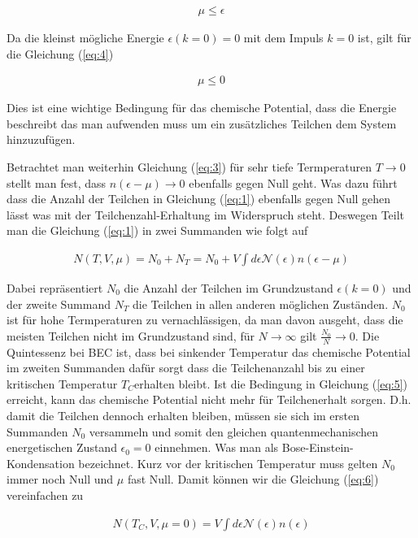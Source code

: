 \begin{align}
  \label{eq:4}
  \mu \le \epsilon
\end{align}

Da die kleinst mögliche Energie \(\epsilon(k=0) = 0\) mit dem Impuls \(k=0\) ist, gilt für die Gleichung (\ref{eq:4})

\begin{align}
  \label{eq:5}
  \mu \le 0
\end{align}

Dies ist eine wichtige Bedingung für das chemische Potential, dass die Energie beschreibt das man aufwenden muss um ein zusätzliches Teilchen dem System hinzuzufügen. 

Betrachtet man weiterhin Gleichung (\ref{eq:3}) für sehr tiefe Termperaturen \(T\to 0\) stellt man fest, dass \(n(\epsilon-\mu)\to 0\) ebenfalls gegen Null geht. Was dazu führt dass die Anzahl der Teilchen in Gleichung (\ref{eq:1}) ebenfalls gegen Null gehen lässt was mit der Teilchenzahl-Erhaltung im Widerspruch steht. Deswegen Teilt man die Gleichung (\ref{eq:1}) in zwei Summanden wie folgt auf

\begin{align}
  \label{eq:6}
   N(T,V,\mu) = N_0 + N_T = N_0 +  V\int d\epsilon \mathcal N(\epsilon) n(\epsilon-\mu)
\end{align}

Dabei repräsentiert \(N_0\) die Anzahl der Teilchen im Grundzustand \(\epsilon(k=0)\) und der zweite Summand \(N_T\) die Teilchen in allen anderen möglichen Zuständen. \(N_0\) ist für hohe Termperaturen zu vernachlässigen, da man davon ausgeht, dass die meisten Teilchen nicht im Grundzustand sind, für \(N\to\infty\) gilt \(\frac{N_0}{N} \to 0\). Die Quintessenz bei BEC ist, dass bei sinkender Temperatur das chemische Potential im zweiten Summanden dafür sorgt dass die Teilchenanzahl bis zu einer kritischen Temperatur \(T_C\)erhalten bleibt. Ist die Bedingung in Gleichung (\ref{eq:5}) erreicht, kann das chemische Potential nicht mehr für Teilchenerhalt sorgen. D.h. damit die Teilchen dennoch erhalten bleiben, müssen sie sich im ersten Summanden \(N_0\) versammeln und somit den gleichen quantenmechanischen energetischen Zustand \(\epsilon_0 = 0\) einnehmen. Was man als Bose-Einstein-Kondensation bezeichnet. Kurz vor der kritischen Temperatur muss gelten \(N_0\) immer noch Null und \(\mu\) fast Null. Damit können wir die Gleichung (\ref{eq:6}) vereinfachen zu

\begin{align}
  \label{eq:7}
  N(T_C,V,\mu=0) = V\int d\epsilon \mathcal N(\epsilon) n(\epsilon)
\end{align}

